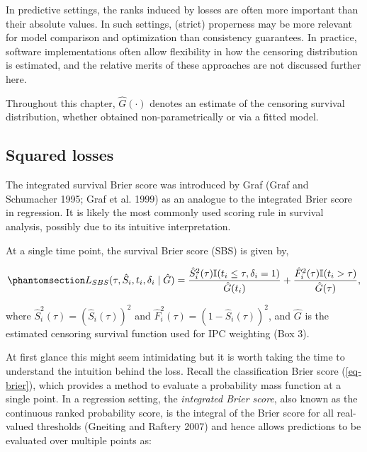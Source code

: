 \documentclass[
  letterpaper,
  krantz2]{style/krantz}
\begin{document}
\begin{tcolorbox}
In predictive settings, the ranks induced by losses are often more
important than their absolute values. In such settings, (strict)
properness may be more relevant for model comparison and optimization
than consistency guarantees. In practice, software implementations often
allow flexibility in how the censoring distribution is estimated, and
the relative merits of these approaches are not discussed further here.

Throughout this chapter, \(\hat{G}(\cdot)\) denotes an estimate of the
censoring survival distribution, whether obtained non-parametrically or
via a fitted model.

\end{tcolorbox}

\subsection{Squared losses}\label{sec-rules-squared}

The integrated survival Brier
score was introduced by Graf
(Graf and Schumacher 1995; Graf et al. 1999) as an analogue to the
integrated Brier score in regression. It is likely the most commonly
used scoring rule in survival analysis, possibly due to its intuitive
interpretation.

At a single time point, the survival Brier score (SBS) is given by,

\begin{equation}\phantomsection\label{eq-sbs}{
L_{SBS}(\tau, \hat{S}_i, t_i, \delta_i \mid \hat{G}) = \frac{\hat{S}_i^2(\tau) \mathbb{I}(t_i \leq \tau, \delta_i=1)}{\hat{G}(t_i)} + \frac{\hat{F}_i^2(\tau) \mathbb{I}(t_i > \tau)}{\hat{G}(\tau)},
}\end{equation}

where \(\hat{S}_i^2(\tau) = (\hat{S}_i(\tau))^2\) and
\(\hat{F}_i^2(\tau) = (1 - \hat{S}_i(\tau))^2\), and \(\hat{G}\) is the
estimated censoring survival function used for IPC weighting (Box 3).

At first glance this might seem intimidating but it is worth taking the
time to understand the intuition behind the loss. Recall the
classification Brier score (\ref{eq-brier}), which provides a method to
evaluate a probability mass function at a single point. In a regression
setting, the \emph{integrated Brier
score}, also known as the continuous
ranked probability score, is the integral of the Brier score for all
real-valued thresholds (Gneiting and Raftery 2007) and hence allows
predictions to be evaluated over multiple points as:
\end{document}
